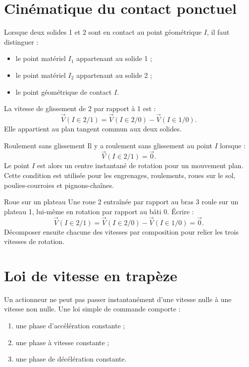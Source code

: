 \section{Cinématique du contact ponctuel}
\label{sec:cine-contact}

Lorsque deux solides 1 et 2 sont en contact au point géométrique $I$, il
faut distinguer :
\begin{itemize}
  \item le point matériel $I_1$ appartenant au solide 1 ;
  \item le point matériel $I_2$ appartenant au solide 2 ;
  \item le point géométrique de contact $I$.
\end{itemize}

La vitesse de glissement de 2 par rapport à 1 est :
\[
\boxed{
\vec V(I\in2/1)
=\vec V(I\in2/0)-\vec V(I\in1/0).}
\]
Elle appartient au plan tangent commun aux deux solides.

\begin{TLCineDef}{Roulement sans glissement}
Il y a roulement sans glissement au point $I$ lorsque :
\[
\boxed{\vec V(I\in2/1)=\vec0.}
\]
Le point $I$ est alors un centre instantané de rotation pour un
mouvement plan. Cette condition est utilisée pour les engrenages,
roulements, roues sur le sol, poulies-courroies et pignons-chaînes.
\end{TLCineDef}

\begin{TLCineApp}{Roue sur un plateau}
Une roue 2 entraînée par rapport au bras 3 roule sur un plateau 1,
lui-même en rotation par rapport au bâti 0. Écrire :
\[
\vec V(I\in2/1)=\vec V(I\in2/0)-\vec V(I\in1/0)=\vec0.
\]
Décomposer ensuite chacune des vitesses par composition pour relier les
trois vitesses de rotation.
\end{TLCineApp}

\section{Loi de vitesse en trapèze}
\label{sec:cine-trapeze}

Un actionneur ne peut pas passer instantanément d'une vitesse nulle à
une vitesse non nulle. Une loi simple de commande comporte :
\begin{enumerate}
  \item une phase d'accélération constante ;
  \item une phase à vitesse constante ;
  \item une phase de décélération constante.
\end{enumerate}

